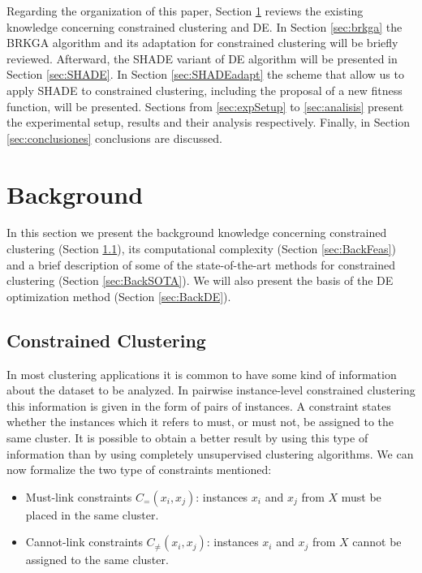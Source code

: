 \documentclass[review]{elsarticle}
\begin{document}
Regarding the organization of this paper, Section \ref{sec:background} reviews the existing knowledge concerning constrained clustering and DE. In Section \ref{sec:brkga} the BRKGA algorithm and its adaptation for constrained clustering will be briefly reviewed. Afterward, the SHADE variant of DE algorithm will be presented in Section \ref{sec:SHADE}. In Section \ref{sec:SHADEadapt} the scheme that allow us to apply SHADE to constrained clustering, including the proposal of a new fitness function, will be presented. Sections from \ref{sec:expSetup} to \ref{sec:analisis} present the experimental setup, results and their analysis respectively. Finally, in Section \ref{sec:conclusiones} conclusions are discussed.

\section{Background} \label{sec:background}

In this section we present the background knowledge concerning constrained clustering (Section \ref{sec:BackCC}), its computational complexity (Section \ref{sec:BackFeas}) and a brief description of some of the state-of-the-art methods for constrained clustering (Section \ref{sec:BackSOTA}). We will also present the basis of the DE optimization method (Section \ref{sec:BackDE}).

\subsection{Constrained Clustering} \label{sec:BackCC}

In most clustering applications it is common to have some kind of information about the dataset to be analyzed. In pairwise instance-level constrained clustering this information is given in the form of pairs of instances. A constraint states whether the instances which it refers to must, or must not, be assigned to the same cluster. It is possible to obtain a better result by using this type of information than by using completely unsupervised clustering algorithms. We can now formalize the two type of constraints mentioned: 

\begin{itemize}

	\item Must-link constraints $C_=(x_i,x_j)$: instances $x_i$ and $x_j$ from $X$ must be placed in the same cluster.

	\item Cannot-link constraints $C_{\neq}(x_i,x_j)$: instances $x_i$ and $x_j$ from $X$ cannot be assigned to the same cluster.

\end{itemize}
\end{document}
